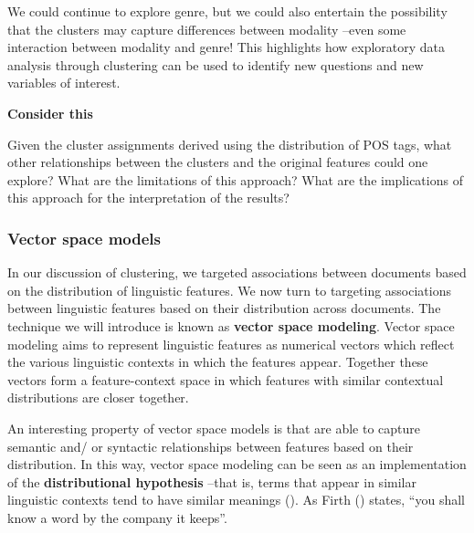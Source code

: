 \documentclass[
  letterpaper,
  DIV=11,
  numbers=noendperiod]{scrreprt}
\theoremstyle{definition}
\theoremstyle{remark}
\begin{document}
We could continue to explore genre, but we could also entertain the
possibility that the clusters may capture differences between modality
--even some interaction between modality and genre! This highlights how
exploratory data analysis through clustering can be used to identify new
questions and new variables of interest.

\begin{tcolorbox}[enhanced jigsaw, leftrule=.75mm, colframe=quarto-callout-color-frame, colback=white, rightrule=.15mm, opacityback=0, arc=.35mm, breakable, bottomrule=.15mm, left=2mm, toprule=.15mm]

\textbf{ Consider this}

Given the cluster assignments derived using the distribution of POS
tags, what other relationships between the clusters and the original
features could one explore? What are the limitations of this approach?
What are the implications of this approach for the interpretation of the
results?

\end{tcolorbox}

\subsubsection{Vector space models}\label{sec-eda-vector-space-models}

In our discussion of clustering, we targeted associations between
documents based on the distribution of linguistic features. We now turn
to targeting associations between linguistic features based on their
distribution across documents. The technique we will introduce is known
as \textbf{vector space modeling}. Vector space modeling aims to
represent linguistic features as numerical vectors which reflect the
various linguistic contexts in which the features appear. Together these
vectors form a feature-context space in which features with similar
contextual distributions are closer together.

An interesting property of vector space models is that are able to
capture semantic and/ or syntactic relationships between features based
on their distribution. In this way, vector space modeling can be seen as
an implementation of the \textbf{distributional hypothesis} --that is,
terms that appear in similar linguistic contexts tend to have similar
meanings (). As Firth
() states, ``you shall know a word by the
company it keeps''.
\end{document}
